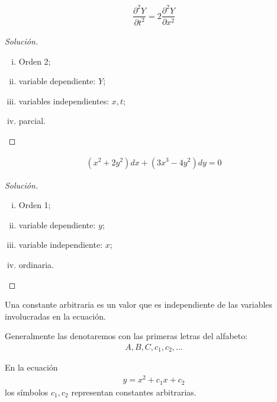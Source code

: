 \begin{resuelto}
\begin{align}
	\dfrac{\partial^{2}Y}{\partial t^{2}} = 2\dfrac{\partial^{2}Y}{\partial x^{2}}
\end{align}
\begin{proof}[Solución]
	\begin{enumerate}[(i)]
		\item Orden 2;
		\item variable dependiente: $ Y $;
		\item variables independientes: $ x,t $;
		\item parcial.
	\end{enumerate}
\end{proof}




\begin{align}
	\left(x^{2}+2y^{2}\right)dx +\left(3x^{3}-4y^{2}\right)dy=0
\end{align}
\begin{proof}[Solución]
	\begin{enumerate}[(i)]
		\item Orden 1;
		\item variable dependiente: $ y  $;
		\item variable independiente: $ x $;
		\item ordinaria.
	\end{enumerate}
\end{proof}


\end{resuelto}


	\begin{definicion}
		Una constante arbitraria es un valor que es independiente de las variables involucradas en la ecuación.
	\end{definicion}

	\begin{observacion}
		Generalmente las denotaremos con las primeras letras del alfabeto:
	\begin{align}
		A,B,C,c_{1},c_{2},...
	\end{align}
	\end{observacion}


	\begin{ejemplo}
		En la ecuación
		\begin{align}
		y = x^{2}+c_{1}x+c_{2}
		\end{align}
		los símbolos $ c_{1}, c_{2} $ representan constantes arbitrarias.

	\end{ejemplo}



